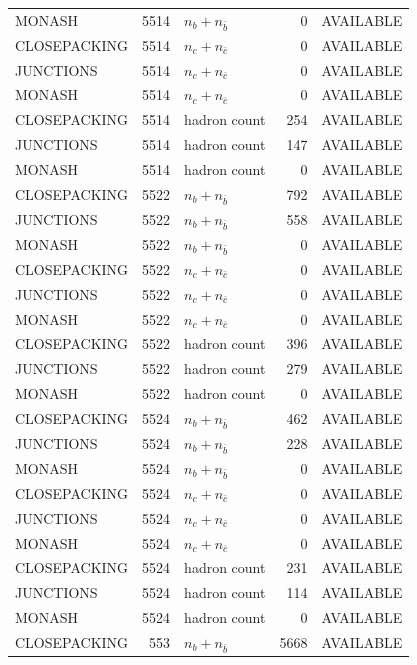 \begin{landscape}
\begin{longtable}{@{}lrlrl@{}}
MONASH & 5514 & $n_b+n_{\bar b}$ & \num{0} & AVAILABLE \\
CLOSEPACKING & 5514 & $n_c+n_{\bar c}$ & \num{0} & AVAILABLE \\
JUNCTIONS & 5514 & $n_c+n_{\bar c}$ & \num{0} & AVAILABLE \\
MONASH & 5514 & $n_c+n_{\bar c}$ & \num{0} & AVAILABLE \\
CLOSEPACKING & 5514 & hadron count & \num{254} & AVAILABLE \\
JUNCTIONS & 5514 & hadron count & \num{147} & AVAILABLE \\
MONASH & 5514 & hadron count & \num{0} & AVAILABLE \\
CLOSEPACKING & 5522 & $n_b+n_{\bar b}$ & \num{792} & AVAILABLE \\
JUNCTIONS & 5522 & $n_b+n_{\bar b}$ & \num{558} & AVAILABLE \\
MONASH & 5522 & $n_b+n_{\bar b}$ & \num{0} & AVAILABLE \\
CLOSEPACKING & 5522 & $n_c+n_{\bar c}$ & \num{0} & AVAILABLE \\
JUNCTIONS & 5522 & $n_c+n_{\bar c}$ & \num{0} & AVAILABLE \\
MONASH & 5522 & $n_c+n_{\bar c}$ & \num{0} & AVAILABLE \\
CLOSEPACKING & 5522 & hadron count & \num{396} & AVAILABLE \\
JUNCTIONS & 5522 & hadron count & \num{279} & AVAILABLE \\
MONASH & 5522 & hadron count & \num{0} & AVAILABLE \\
CLOSEPACKING & 5524 & $n_b+n_{\bar b}$ & \num{462} & AVAILABLE \\
JUNCTIONS & 5524 & $n_b+n_{\bar b}$ & \num{228} & AVAILABLE \\
MONASH & 5524 & $n_b+n_{\bar b}$ & \num{0} & AVAILABLE \\
CLOSEPACKING & 5524 & $n_c+n_{\bar c}$ & \num{0} & AVAILABLE \\
JUNCTIONS & 5524 & $n_c+n_{\bar c}$ & \num{0} & AVAILABLE \\
MONASH & 5524 & $n_c+n_{\bar c}$ & \num{0} & AVAILABLE \\
CLOSEPACKING & 5524 & hadron count & \num{231} & AVAILABLE \\
JUNCTIONS & 5524 & hadron count & \num{114} & AVAILABLE \\
MONASH & 5524 & hadron count & \num{0} & AVAILABLE \\
CLOSEPACKING & 553 & $n_b+n_{\bar b}$ & \num{5668} & AVAILABLE \\

\end{longtable}
\end{landscape}
